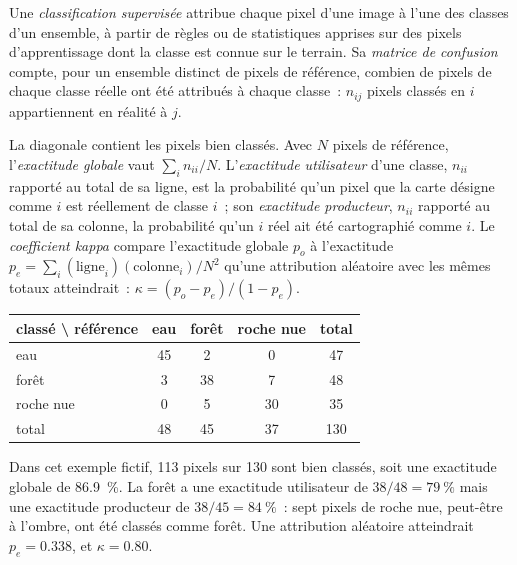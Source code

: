 \begin{definition}\label{def:b3:remote-sensing-gis:classification}
Une \emph{classification supervisée}
attribue chaque pixel d'une image à l'une des classes d'un ensemble, à partir de règles ou
de statistiques apprises sur des pixels d'apprentissage dont la classe est connue sur le terrain.
Sa \emph{matrice de confusion} compte, pour un ensemble distinct
de pixels de référence, combien de pixels de chaque classe réelle ont été attribués à chaque
classe~: $n_{ij}$ pixels classés en $i$ appartiennent en réalité à $j$.
\end{definition}

La diagonale contient les pixels bien classés. Avec $N$ pixels de référence,
l'\emph{exactitude globale} vaut $\sum_i n_{ii}/N$. L'\emph{exactitude utilisateur}
d'une classe, $n_{ii}$ rapporté au total de sa ligne, est la probabilité qu'un
pixel que la carte désigne comme $i$ est réellement de classe $i$~; son \emph{exactitude producteur}, $n_{ii}$
rapporté au total de sa colonne, la probabilité qu'un $i$ réel ait été cartographié comme $i$. Le
\emph{coefficient kappa} compare l'exactitude globale $p_o$ à
l'exactitude $p_e = \sum_i (\text{ligne}_i)(\text{colonne}_i)/N^2$ qu'une attribution aléatoire
avec les mêmes totaux atteindrait~: $\kappa = (p_o - p_e)/(1 -
p_e)$.

\begin{center}
\small
\begin{tabular}{l|ccc|c}
\hline
classé \textbackslash{} référence & eau & forêt & roche nue & total \\
\hline
eau & 45 & 2 & 0 & 47 \\
forêt & 3 & 38 & 7 & 48 \\
roche nue & 0 & 5 & 30 & 35 \\
\hline
total & 48 & 45 & 37 & 130 \\
\hline
\end{tabular}
\end{center}

Dans cet exemple fictif, 113 pixels sur 130 sont bien classés, soit une exactitude
globale de \qty{86.9}{\percent}. La forêt a une exactitude utilisateur de
$38/48 = \qty{79}{\percent}$ mais une exactitude producteur de $38/45 =
\qty{84}{\percent}$~: sept pixels de roche nue, peut-être à l'ombre, ont été
classés comme forêt. Une attribution aléatoire atteindrait $p_e = 0.338$, et $\kappa =
0.80$.

